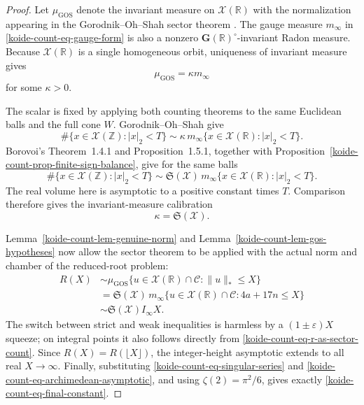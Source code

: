 \begin{proof}
Let \(\mu_{\mathrm{GOS}}\) denote the invariant measure on
\(\mathscr X(\mathbb R)\) with the normalization appearing in the
Gorodnik--Oh--Shah sector theorem
\cite[Theorem~1.6]{GorodnikOhShah_2009}.  The gauge measure \(m_\infty\)
in \eqref{koide-count-eq-gauge-form} is also a nonzero
\(\mathbf G(\mathbb R)^\circ\)-invariant Radon measure.  Because
\(\mathscr X(\mathbb R)\) is a single homogeneous orbit, uniqueness of
invariant measure gives
\begin{equation}
 \mu_{\mathrm{GOS}}=\kappa m_\infty
 \label{koide-count-eq-measure-scalar}
\end{equation}
for some \(\kappa>0\).

The scalar is fixed by applying both counting theorems to the same Euclidean
balls and the full cone \(W\).  Gorodnik--Oh--Shah give
\[
 \#\{x\in\mathscr X(\mathbb Z):|x|_2<T\}
 \sim\kappa\,m_\infty
 \{x\in\mathscr X(\mathbb R):|x|_2<T\}.
\]
Borovoi's Theorem~1.4.1 and Proposition~1.5.1, together with
Proposition~\ref{koide-count-prop-finite-sign-balance}, give for the same
balls
\[
 \#\{x\in\mathscr X(\mathbb Z):|x|_2<T\}
 \sim\mathfrak S(\mathscr X)\,m_\infty
 \{x\in\mathscr X(\mathbb R):|x|_2<T\}.
\]
The real volume here is asymptotic to a positive constant times \(T\).
Comparison therefore gives the invariant-measure calibration
\begin{equation}
 \kappa=\mathfrak S(\mathscr X).
 \label{koide-count-eq-measure-calibration}
\end{equation}

Lemma~\ref{koide-count-lem-genuine-norm} and
Lemma~\ref{koide-count-lem-gos-hypotheses} now allow the sector theorem to
be applied with the actual norm and chamber of the reduced-root problem:
\begin{align*}
 R(X)
 &\sim\mu_{\mathrm{GOS}}
 \{u\in\mathscr X(\mathbb R)\cap\mathcal C:
       \lVert u\rVert_*\leq X\}\\
 &=\mathfrak S(\mathscr X)\,
 m_\infty\{u\in\mathscr X(\mathbb R)\cap\mathcal C:
       4a+17n\leq X\}\\
 &\sim\mathfrak S(\mathscr X)I_\infty X.
\end{align*}
The switch between strict and weak inequalities is harmless by a
\((1\pm\varepsilon)X\) squeeze; on integral points it also follows directly
from \eqref{koide-count-eq-r-as-sector-count}.  Since
\(R(X)=R(\lfloor X\rfloor)\), the integer-height asymptotic extends to all
real \(X\to\infty\).  Finally, substituting
\eqref{koide-count-eq-singular-series} and
\eqref{koide-count-eq-archimedean-asymptotic}, and using
\(\zeta(2)=\pi^2/6\), gives exactly
\eqref{koide-count-eq-final-constant}.
\end{proof}


